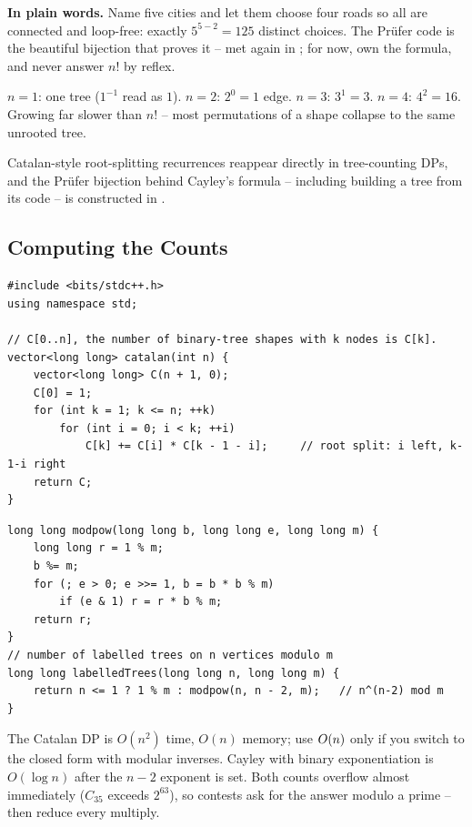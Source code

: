 \noindent\textbf{In plain words.} Name five cities and let them choose four roads so all
are connected and loop-free: exactly $5^{5-2}=125$ distinct choices. The Pr\"ufer code is
the beautiful bijection that proves it -- met again in ; for now, own the
formula, and never answer $n!$ by reflex.
\begin{insightbox}
$n=1$: one tree ($1^{-1}$ read as $1$). $n=2$: $2^0=1$ edge. $n=3$: $3^1=3$. $n=4$:
$4^2=16$. Growing far slower than $n!$ -- most permutations of a shape collapse to the
same unrooted tree.
\end{insightbox}

{Catalan-style root-splitting recurrences reappear directly in tree-counting DPs, and the
Pr\"ufer bijection behind Cayley's formula -- including building a tree from its code --
is constructed in .}

\subsection{Computing the Counts}

\begin{lstlisting}[caption={Catalan numbers by DP, $C_0 \dots C_n$ (grows fast -- use big integers past $n \approx 30$)}, label={lst:c01-catalan}]
#include <bits/stdc++.h>
using namespace std;

// C[0..n], the number of binary-tree shapes with k nodes is C[k].
vector<long long> catalan(int n) {
    vector<long long> C(n + 1, 0);
    C[0] = 1;
    for (int k = 1; k <= n; ++k)
        for (int i = 0; i < k; ++i)
            C[k] += C[i] * C[k - 1 - i];     // root split: i left, k-1-i right
    return C;
}
\end{lstlisting}

\begin{lstlisting}[caption={Cayley modulo a prime: $n^{\,n-2} \bmod m$ by fast exponentiation}, label={lst:c01-cayley-pow}]
long long modpow(long long b, long long e, long long m) {
    long long r = 1 % m;
    b %= m;
    for (; e > 0; e >>= 1, b = b * b % m)
        if (e & 1) r = r * b % m;
    return r;
}
// number of labelled trees on n vertices modulo m
long long labelledTrees(long long n, long long m) {
    return n <= 1 ? 1 % m : modpow(n, n - 2, m);   // n^(n-2) mod m
}
\end{lstlisting}

\begin{complexitybox}
The Catalan DP is $O(n^2)$ time, $O(n)$ memory; use $O(n)$ only if you switch to the
closed form with modular inverses. Cayley with binary exponentiation is $O(\log n)$ after
the $n-2$ exponent is set. Both counts overflow  almost immediately
($C_{35}$ exceeds $2^{63}$), so contests ask for the answer modulo a prime -- then reduce
every multiply.
\end{complexitybox}

